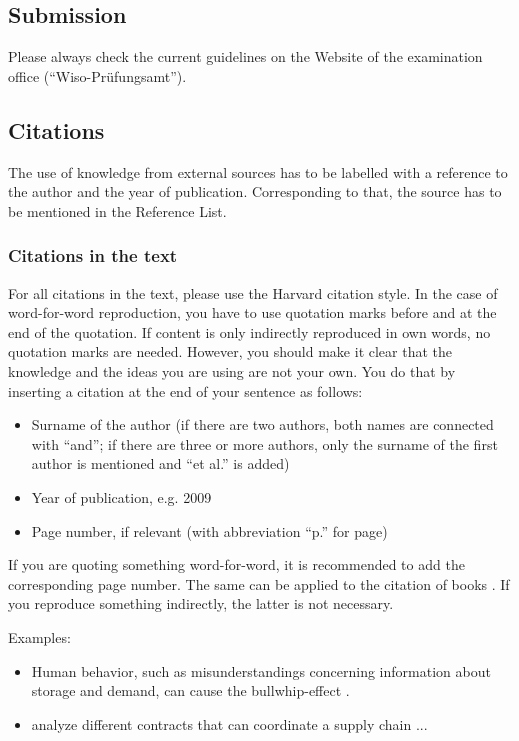 \documentclass[a4paper,12pt, titlepage]{article}
\begin{document}
\subsection{Submission}\label{2.5}
Please always check the current guidelines on the Website of the examination office (“Wiso-Prüfungsamt”).


\subsection{Citations}\label{2.6}
The use of knowledge from external sources has to be labelled with a reference to the author and the year of publication. Corresponding to that, the source has to be mentioned in the Reference List.

\subsubsection{Citations in the text}\label{2.6.1}
For all citations in the text, please use the Harvard citation style. In the case of word-for-word reproduction, you have to use quotation marks before and at the end of the quotation. If content is only indirectly reproduced in own words, no quotation marks are needed.  However, you should make it clear that the knowledge and the ideas you are using are not your own. You do that by inserting a citation at the end of your sentence as follows: 
\begin{itemize}
    \item Surname of the author (if there are two authors, both names are connected with “and”; if there are three or more authors, only the surname of the first author is mentioned and “et al.” is added)
    \item Year of publication, e.g. 2009
    \item Page number, if relevant (with abbreviation “p.” for page)
\end{itemize}
If you are quoting something word-for-word, it is recommended to add the corresponding page number. The same can be applied to the citation of books \parencite[p.~198]{thonemann2010operations}. If you reproduce something indirectly, the latter is not necessary. \par
Examples:
\begin{itemize}
    \item Human behavior, such as misunderstandings concerning information about storage and demand, can cause the bullwhip-effect \parencite{sterman1989misperceptions}.
    \item \textcite{CACHON2003227} analyze different contracts that can coordinate a supply chain ...
\end{itemize}
\end{document}
